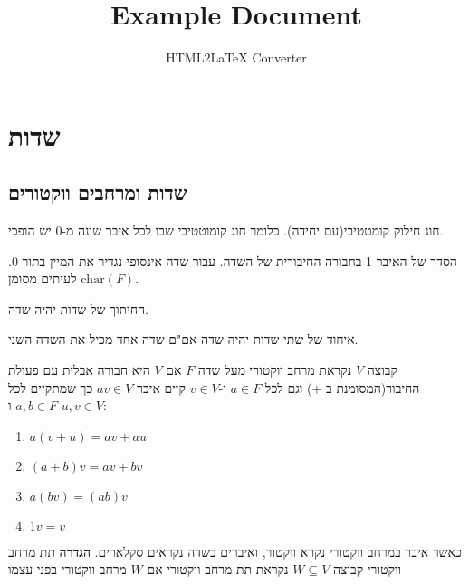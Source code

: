 \documentclass{tstextbook}
\begin{document}
\title{Example Document}
\author{HTML2LaTeX Converter}
\maketitle

\section{שדות}

\subsection{שדות ומרחבים ווקטורים}

\begin{definition}[שדה]
חוג חילוק קומטטיבי(עם יחידה). כלומר חוג קומוטטיבי שבו לכל איבר שונה מ-0 יש הופכי.

\end{definition}
\begin{definition}
הסדר של האיבר 1 בחבורה החיבורית של השדה. עבור שדה אינסופי נגדיר את המיין בתור 0. לעיתים מסומן \(\mathrm{char}(F)\).

\end{definition}
\begin{proposition}
החיתוך של שדות יהיה שדה.

\end{proposition}
\begin{proposition}
איחוד של שתי שדות יהיה שדה אם"ם שדה אחד מכיל את השדה השני.

\end{proposition}
\begin{definition}
קבוצה \(V\) נקראת מרחב ווקטורי מעל שדה \(F\) אם \(V\) היא חבורה אבלית עם פעולת החיבור(המסומנת ב \(+\)) וגם לכל \(a\in F\) ו-\(v \in V\) קיים איבר \(av \in V\) כך שמתקיים לכל \(a,b \in F\) ו-\(u,v \in V\):

  \begin{enumerate}
    \item \(a(v+u)=av+a u\)


    \item \((a+b)v=av+bv\)


    \item \(a(bv)=(a b)v\)


    \item \(1v=v\)


  \end{enumerate}
\end{definition}
כאשר איבר במרחב ווקטורי נקרא ווקטור, ואיברים בשדה נקראים סקלארים.
\textbf{הגדרה} תת מרחב ווקטורי
קבוצה \(W\subseteq V\) נקראת תת מרחב ווקטורי אם \(W\) מרחב ווקטורי בפני עצמו
\end{document}
